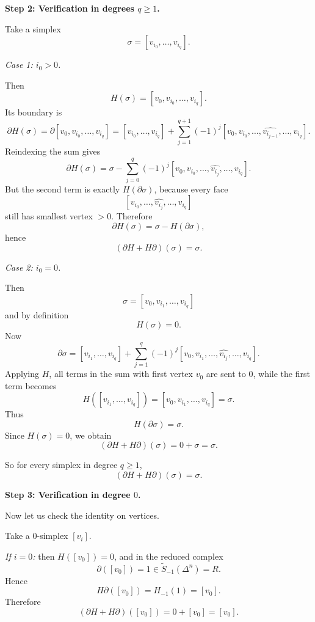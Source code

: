 \begin{solution}
\medskip
\noindent\textbf{Step 2: Verification in degrees \(q\ge 1\).}\par
\smallskip


Take a simplex
\[
\sigma=[v_{i_0},\dots,v_{i_q}].
\]

\par

\noindent
\emph{Case 1: \(i_0>0\).}

Then
\[
H(\sigma)=[v_0,v_{i_0},\dots,v_{i_q}].
\]
Its boundary is
\[
\partial H(\sigma)
=
\partial [v_0,v_{i_0},\dots,v_{i_q}]
=
[v_{i_0},\dots,v_{i_q}]
+
\sum_{j=1}^{q+1}(-1)^j
[v_0,v_{i_0},\dots,\widehat{v_{i_{j-1}}},\dots,v_{i_q}].
\]
Reindexing the sum gives
\[
\partial H(\sigma)
=
\sigma
-
\sum_{j=0}^{q}(-1)^j
[v_0,v_{i_0},\dots,\widehat{v_{i_j}},\dots,v_{i_q}].
\]
But the second term is exactly \(H(\partial \sigma)\), because every face
\[
[v_{i_0},\dots,\widehat{v_{i_j}},\dots,v_{i_q}]
\]
still has smallest vertex \(>0\). Therefore
\[
\partial H(\sigma)=\sigma-H(\partial \sigma),
\]
hence
\[
(\partial H+H\partial)(\sigma)=\sigma.
\]

\par

\noindent
\emph{Case 2: \(i_0=0\).}

Then
\[
\sigma=[v_0,v_{i_1},\dots,v_{i_q}]
\]
and by definition
\[
H(\sigma)=0.
\]
Now
\[
\partial \sigma
=
[v_{i_1},\dots,v_{i_q}]
+
\sum_{j=1}^{q}(-1)^j
[v_0,v_{i_1},\dots,\widehat{v_{i_j}},\dots,v_{i_q}].
\]
Applying \(H\), all terms in the sum with first vertex \(v_0\) are sent to \(0\), while the first term becomes
\[
H([v_{i_1},\dots,v_{i_q}])=[v_0,v_{i_1},\dots,v_{i_q}]=\sigma.
\]
Thus
\[
H(\partial \sigma)=\sigma.
\]
Since \(H(\sigma)=0\), we obtain
\[
(\partial H+H\partial)(\sigma)=0+\sigma=\sigma.
\]

So for every simplex in degree \(q\ge 1\),
\[
(\partial H+H\partial)(\sigma)=\sigma.
\]


\medskip
\noindent\textbf{Step 3: Verification in degree \(0\).}\par
\smallskip


Now let us check the identity on vertices.

Take a \(0\)-simplex \([v_i]\).

\par

\noindent
\emph{If \(i=0\):} then \(H([v_0])=0\), and in the reduced complex
\[
\partial([v_0])=1\in \widetilde{S}_{-1}(\Delta^n)=R.
\]
Hence
\[
H\partial([v_0])=H_{-1}(1)=[v_0].
\]
Therefore
\[
(\partial H+H\partial)([v_0])=0+[v_0]=[v_0].
\]


\end{solution}
